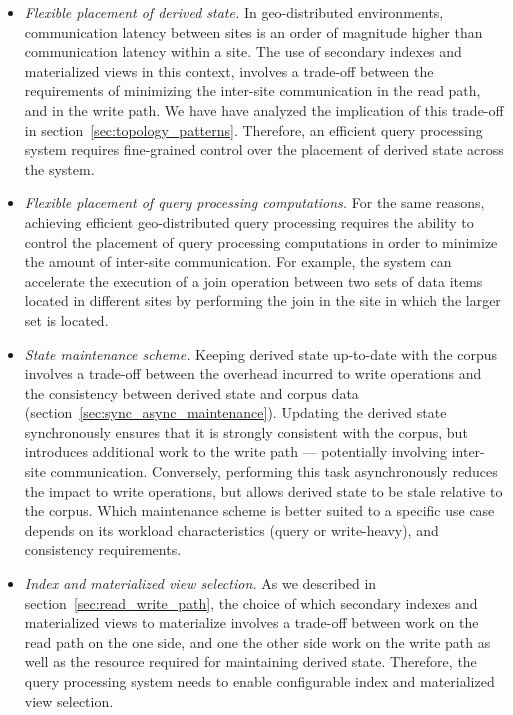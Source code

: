\begin{itemize}
  \item \textit{Flexible placement of derived state.}
  In geo-distributed environments, communication latency between sites is an order of magnitude higher than
  communication latency within a site.
  The use of secondary indexes and materialized views in this context, involves a trade-off between the requirements
  of minimizing the inter-site communication in the read path, and in the write path.
  We have have analyzed the implication of this trade-off in section~\ref{sec:topology_patterns}.
  Therefore, an efficient query processing system requires fine-grained control over the placement of derived state
  across the system.

  \item \textit{Flexible placement of query processing computations.}
  For the same reasons, achieving efficient geo-distributed query processing requires the ability to control the
  placement of query processing computations in order to minimize the amount of inter-site communication.
  For example, the system can accelerate the execution of a join operation between two sets of data items located in different sites
  by performing the join in the site in which the larger set is located.

  \item \textit{State maintenance scheme.}
  Keeping derived state up-to-date with the corpus involves a trade-off between
  the overhead incurred to write operations and the consistency between derived state and corpus data (section~\ref{sec:sync_async_maintenance}).
  Updating the derived state synchronously
  ensures that it is strongly consistent with the
  corpus, but introduces additional work to the write path --- potentially involving inter-site communication.
  Conversely, performing this task asynchronously reduces the impact to write operations,
  but allows derived state to be stale relative to the corpus.
  Which maintenance scheme is better suited to a specific use case depends on its workload characteristics (query or write-heavy), and consistency requirements.

  \item \textit{Index and materialized view selection.}
  As we described in section~\ref{sec:read_write_path}, the choice of which secondary indexes and materialized views to
  materialize involves a trade-off between work on the read path on the one side,
  and one the other side work on the write path as well as the resource required for maintaining derived state.
  Therefore, the query processing system needs to enable configurable index and materialized view selection.


\end{itemize}
